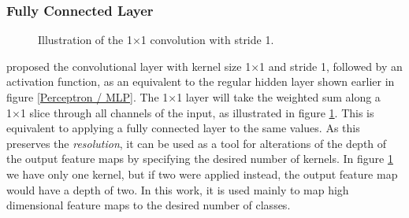 \subsubsection{Fully Connected Layer}
    \begin{figure}[H]
        \centering
        
        \caption[1×1 convolution]{Illustration of the 1×1 convolution with stride 1.}
      	\medskip 
        \label{1x1_fig}
    \end{figure}
    \citeauthor{lin2013network_in_network_1x1}\cite{lin2013network_in_network_1x1} proposed the convolutional layer with kernel size 1×1 and stride 1, followed by an activation function, as an equivalent to the regular hidden layer shown earlier in figure \ref{Perceptron / MLP}. The 1×1 layer will take the weighted sum along a 1×1 slice through all channels of the input, as illustrated in figure \ref{1x1_fig}. This is equivalent to applying a fully connected layer to the same values. As this preserves the \textit{resolution}, it can be used as a tool for alterations of the depth of the output feature maps by specifying the desired number of kernels. In figure \ref{1x1_fig} we have only one kernel, but if two were applied instead, the output feature map would have a depth of two. In this work, it is used mainly to map high dimensional feature maps to the desired number of classes.
    
    

